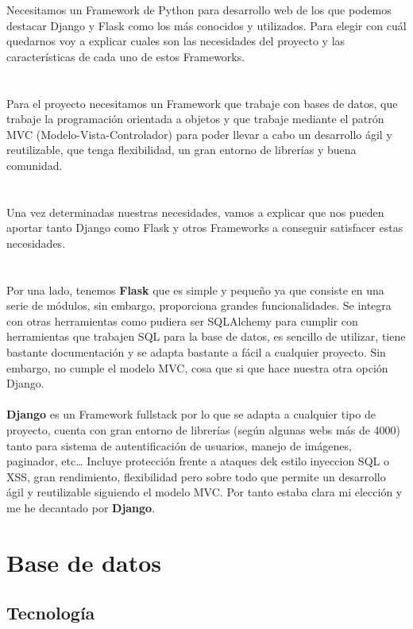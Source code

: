 Necesitamos un Framework de Python para desarrollo web de los que podemos destacar Django y Flask como los más conocidos y utilizados.
Para elegir con cuál quedarnos voy a explicar cuales son las necesidades del proyecto y las características
de cada uno de estos Frameworks.\\\\
\\
Para el proyecto necesitamos un Framework que trabaje con bases de datos, que trabaje la programación orientada a objetos y que trabaje 
mediante el patrón MVC (Modelo-Vista-Controlador) para poder llevar a cabo un desarrollo ágil y reutilizable, que tenga flexibilidad, 
un gran entorno de librerías y buena comunidad.\\
\\\\
Una vez determinadas nuestras necesidades, vamos a explicar que nos pueden aportar tanto Django como Flask y otros Frameworks a conseguir satisfacer estas necesidades.\\\\
\\
Por una lado, tenemos \textbf{Flask} que es simple y pequeño ya que consiste en una serie de módulos, sin embargo, proporciona grandes funcionalidades.
Se integra con otras herramientas como pudiera ser SQLAlchemy para cumplir con herramientas que trabajen SQL para la base de datos, es sencillo de utilizar, tiene bastante documentación y se adapta bastante a fácil a cualquier proyecto.
Sin embargo, no cumple el modelo MVC, cosa que si que hace nuestra otra opción Django.\\
\\
\textbf{Django} es un Framework fullstack por lo que se adapta a cualquier tipo de proyecto, cuenta con gran entorno de librerías (según algunas webs más de 4000) tanto para sistema de autentificación de usuarios, manejo de imágenes, paginador, etc\dots
Incluye protección frente a ataques dek estilo inyeccion SQL o XSS, gran rendimiento, flexibilidad pero sobre todo que permite un desarrollo ágil y reutilizable siguiendo el modelo MVC.
Por tanto estaba clara mi elección y me he decantado por \textbf{Django}.

\section{Base de datos}

\subsection{Tecnología}

